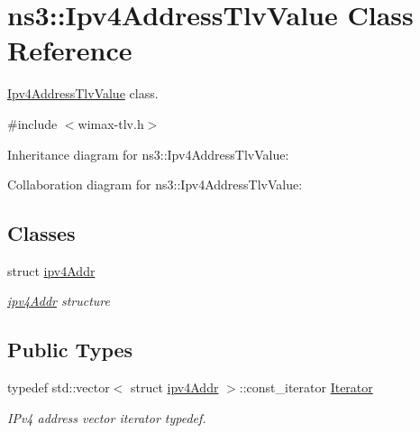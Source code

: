 \hypertarget{classns3_1_1Ipv4AddressTlvValue}{}\section{ns3\+:\+:Ipv4\+Address\+Tlv\+Value Class Reference}
\label{classns3_1_1Ipv4AddressTlvValue}


\hyperlink{classns3_1_1Ipv4AddressTlvValue}{Ipv4\+Address\+Tlv\+Value} class.  




{\ttfamily \#include $<$wimax-\/tlv.\+h$>$}



Inheritance diagram for ns3\+:\+:Ipv4\+Address\+Tlv\+Value\+:


Collaboration diagram for ns3\+:\+:Ipv4\+Address\+Tlv\+Value\+:
\subsection*{Classes}
\begin{DoxyCompactItemize}
\item 
struct \hyperlink{structns3_1_1Ipv4AddressTlvValue_1_1ipv4Addr}{ipv4\+Addr}
\begin{DoxyCompactList}\small\item\em \hyperlink{structns3_1_1Ipv4AddressTlvValue_1_1ipv4Addr}{ipv4\+Addr} structure \end{DoxyCompactList}\end{DoxyCompactItemize}
\subsection*{Public Types}
\begin{DoxyCompactItemize}
\item 
typedef std\+::vector$<$ struct \hyperlink{structns3_1_1Ipv4AddressTlvValue_1_1ipv4Addr}{ipv4\+Addr} $>$\+::const\+\_\+iterator \hyperlink{classns3_1_1Ipv4AddressTlvValue_a459ee680950c4dc60b4962224f6c7992}{Iterator}
\begin{DoxyCompactList}\small\item\em I\+Pv4 address vector iterator typedef. \end{DoxyCompactList}\end{DoxyCompactItemize}
